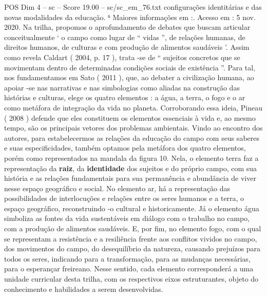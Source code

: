 \begin{textsample}{POS Dim 4 – sc – Score 19.00 – sc/sc\_em\_76.txt}
configurações identitárias e das novas modalidades da educação. ⁶ Maiores informações em :.
Acesso em : 5 nov. 2020.
Na trilha, propomos o aprofundamento de debates que buscam articular conceitualmente ‘ o campo como lugar de “ vidas ”, de relações humanas, de direitos humanos, de culturas e com produção de alimentos saudáveis ’.
Assim como revela Caldart ( 2004, p. 17 ), trata -se de “ sujeitos concretos que se movimentam dentro de determinadas condições sociais de existência ”.
Para tal, nos fundamentamos em Sato ( 2011 ), que, ao debater a civilização humana, ao apoiar -se nas narrativas e nas simbologias como aliadas na construção das histórias e culturas, elege os quatro elementos : a água, a terra, o fogo e o ar como metáfora de integração da vida no planeta.
Corroborando essa ideia, Pineau ( 2008 ) defende que eles constituem os elementos essenciais à vida e, ao mesmo tempo, são os principais vetores dos problemas ambientais.
Vindo ao encontro dos autores, para estabelecermos as relações da educação do campo com seus saberes e suas especificidades, também optamos pela metáfora dos quatro elementos, porém como representados na mandala da figura 10.
Nela, o elemento terra faz a representação da \textbf{raiz}, da \textbf{identidade} dos sujeitos e do próprio campo, com sua história e as relações fundamentais para sua permanência e abundância de viver nesse espaço geográfico e social.
No elemento ar, há a representação das possibilidades de interlocuções e relações entre os seres humanos e a terra, o espaço geográfico, reconstruindo -o cultural e historicamente.
Já o elemento água simboliza as fontes da vida sustentáveis em diálogo com o trabalho no campo, com a produção de alimentos saudáveis.
E, por fim, no elemento fogo, com o qual se representam a resistência e a resiliência frente aos conflitos vividos no campo, dos movimentos do campo, do desequilíbrio da natureza, causando prejuízos para todos os seres, indicando para a transformação, para as mudanças necessárias, para o esperançar freireano.
Nesse sentido, cada elemento corresponderá a uma unidade curricular desta trilha, com os respectivos eixos estruturantes, objeto do conhecimento e habilidades a serem desenvolvidas.

\end{textsample}
